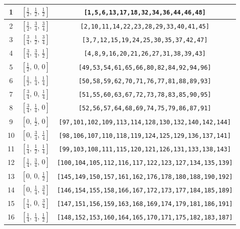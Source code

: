 \documentclass[fleqn,8pt]{jsarticle}
\begin{document}
\begin{longtable}{ccc}
1 & $\left[ \frac{1}{2},\, \frac{1}{2},\, \frac{1}{2} \right]$ & {\tt [1,5,6,13,17,18,32,34,36,44,46,48]} \\ \hline
2 & $\left[ \frac{1}{2},\, \frac{3}{4},\, \frac{3}{4} \right]$ & {\tt [2,10,11,14,22,23,28,29,33,40,41,45]} \\ \hline
3 & $\left[ \frac{3}{4},\, \frac{1}{2},\, \frac{3}{4} \right]$ & {\tt [3,7,12,15,19,24,25,30,35,37,42,47]} \\ \hline
4 & $\left[ \frac{3}{4},\, \frac{3}{4},\, \frac{1}{2} \right]$ & {\tt [4,8,9,16,20,21,26,27,31,38,39,43]} \\ \hline
5 & $\left[ \frac{1}{2},\, 0,\, 0 \right]$ & {\tt [49,53,54,61,65,66,80,82,84,92,94,96]} \\ \hline
6 & $\left[ \frac{1}{2},\, \frac{1}{4},\, \frac{1}{4} \right]$ & {\tt [50,58,59,62,70,71,76,77,81,88,89,93]} \\ \hline
7 & $\left[ \frac{3}{4},\, 0,\, \frac{1}{4} \right]$ & {\tt [51,55,60,63,67,72,73,78,83,85,90,95]} \\ \hline
8 & $\left[ \frac{3}{4},\, \frac{1}{4},\, 0 \right]$ & {\tt [52,56,57,64,68,69,74,75,79,86,87,91]} \\ \hline
9 & $\left[ 0,\, \frac{1}{2},\, 0 \right]$ & {\tt [97,101,102,109,113,114,128,130,132,140,142,144]} \\ \hline
10 & $\left[ 0,\, \frac{3}{4},\, \frac{1}{4} \right]$ & {\tt [98,106,107,110,118,119,124,125,129,136,137,141]} \\ \hline
11 & $\left[ \frac{1}{4},\, \frac{1}{2},\, \frac{1}{4} \right]$ & {\tt [99,103,108,111,115,120,121,126,131,133,138,143]} \\ \hline
12 & $\left[ \frac{1}{4},\, \frac{3}{4},\, 0 \right]$ & {\tt [100,104,105,112,116,117,122,123,127,134,135,139]} \\ \hline
13 & $\left[ 0,\, 0,\, \frac{1}{2} \right]$ & {\tt [145,149,150,157,161,162,176,178,180,188,190,192]} \\ \hline
14 & $\left[ 0,\, \frac{1}{4},\, \frac{3}{4} \right]$ & {\tt [146,154,155,158,166,167,172,173,177,184,185,189]} \\ \hline
15 & $\left[ \frac{1}{4},\, 0,\, \frac{3}{4} \right]$ & {\tt [147,151,156,159,163,168,169,174,179,181,186,191]} \\ \hline
16 & $\left[ \frac{1}{4},\, \frac{1}{4},\, \frac{1}{2} \right]$ & {\tt [148,152,153,160,164,165,170,171,175,182,183,187]} \\
\end{longtable}
\renewcommand{\arraystretch}{1.2}
\end{document}

